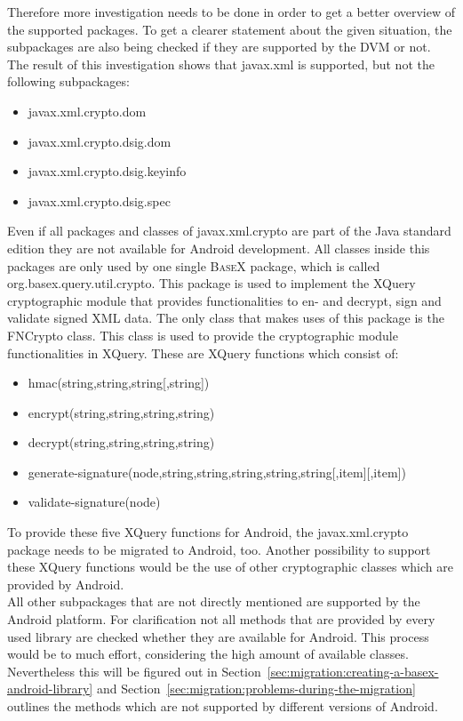 Therefore more investigation needs to be done in order to get a better overview of the supported packages.
To get a clearer statement about the given situation, the subpackages are also being checked if they are supported by the DVM or not.
The result of this investigation shows that \textsf{javax.xml} is supported, but not the following subpackages:
\begin{itemize}
	\item \textsf{javax.xml.crypto.dom}
	\item \textsf{javax.xml.crypto.dsig.dom}
	\item \textsf{javax.xml.crypto.dsig.keyinfo}
	\item \textsf{javax.xml.crypto.dsig.spec}
\end{itemize}
Even if all packages and classes of \textsf{javax.xml.crypto} are part of the Java standard edition they are not available for Android development.
All classes inside this packages are only used by one single \textsc{BaseX} package, which is called \textsf{org.basex.query.\-util.crypto}.
This package is used to implement the XQuery cryptographic module that provides functionalities to en- and decrypt, sign and validate signed XML data.
The only class that makes uses of this package is the \textsf{FNCrypto} class.
This class is used to provide the cryptographic module functionalities in XQuery.
These are XQuery functions which consist of:
\begin{itemize}
	\item \textsf{hmac(string,string,string[,string])}
	\item \textsf{encrypt(string,string,string,string)}
	\item \textsf{decrypt(string,string,string,string)}
	\item \textsf{generate-signature(node,string,string,string,string,string[,item][,item])}
	\item \textsf{validate-signature(node)}
\end{itemize}
To provide these five XQuery functions for Android, the \textsf{javax.xml.crypto} package needs to be migrated to Android, too.
Another possibility to support these XQuery functions would be the use of other cryptographic classes which are provided by Android.\\
All other subpackages that are not directly mentioned are supported by the Android platform.
For clarification not all methods that are provided by every used library are checked whether they are available for Android.
This process would be to much effort, considering the high amount of available classes.
Nevertheless this will be figured out in Section~\ref{sec:migration:creating-a-basex-android-library} and Section~\ref{sec:migration:problems-during-the-migration} outlines the methods which are not supported by different versions of Android.

